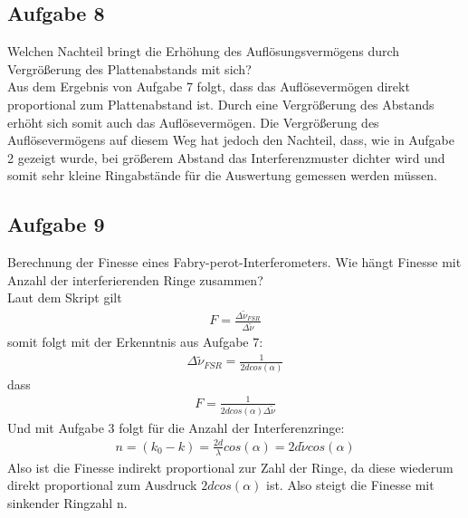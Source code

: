 \documentclass[a4paper,10pt]{scrartcl}
\begin{document}
	\subsection{Aufgabe 8}
	Welchen Nachteil bringt die Erhöhung des Auflösungsvermögens durch Vergrößerung des
	Plattenabstands mit sich?\\
	Aus dem Ergebnis von Aufgabe 7 folgt, dass das Auflösevermögen direkt proportional zum Plattenabstand ist. Durch eine Vergrößerung des Abstands erhöht sich somit auch das Auflösevermögen. Die Vergrößerung des Auflösevermögens auf diesem Weg hat jedoch den Nachteil, dass, wie in Aufgabe 2 gezeigt wurde, bei größerem Abstand das Interferenzmuster dichter wird und somit sehr kleine Ringabstände für die Auswertung gemessen werden müssen.
	
	\subsection{Aufgabe 9}
	Berechnung der Finesse eines Fabry-perot-Interferometers. Wie hängt Finesse mit Anzahl der interferierenden Ringe zusammen?\\
	Laut dem Skript gilt
	\begin{align*}
	F=\frac{\Delta \tilde{\nu}_{FSR}}{\Delta \tilde{\nu}}
	\end{align*}
	somit folgt mit der Erkenntnis aus Aufgabe 7:
	\begin{align*}
	\Delta\tilde{\nu}_{FSR}=\frac{1}{2dcos(\alpha)}
	\end{align*}
	dass
	\begin{align*}
	F=\frac{1}{2dcos(\alpha)\Delta\tilde{\nu}}
	\end{align*}
	Und mit Aufgabe 3 folgt für die Anzahl der Interferenzringe:
	\begin{align*}
	n=(k_{0}-k)=\frac{2d}{\lambda}cos(\alpha)=2d\tilde{\nu}cos(\alpha)
	\end{align*}
	Also ist die Finesse indirekt proportional zur Zahl der Ringe, da diese wiederum direkt proportional zum Ausdruck \(2dcos(\alpha)\) ist. Also steigt die Finesse mit sinkender Ringzahl n.
\end{document}
